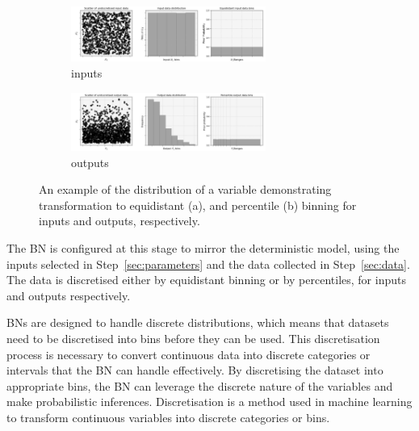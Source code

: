\documentclass[journal]{IEEEtran}
\begin{document}
\begin{figure}[t]
    \centering
    \begin{minipage}{\textwidth}
        \begin{subfigure}{\textwidth}
            \centering
            \includegraphics[width=0.7\textwidth]{figures/TE_results/march_data/equidistant_binning.png}
            \caption{\small inputs}\label{fig:input_dist_eg}
        \end{subfigure}
    \end{minipage}
    \begin{minipage}{\textwidth}
        \begin{subfigure}{\textwidth}
            \centering
            \includegraphics[width=0.7\textwidth]{figures/TE_results/march_data/percentile_binning.png}
            \caption{\small outputs}\label{fig:output_dist_eg}
        \end{subfigure}
    \end{minipage}
    \caption{\small An example of the distribution of a variable demonstrating transformation to equidistant (a), and percentile (b) binning for inputs and outputs, respectively.}\label{fig:dists_eg}
\end{figure}


The BN is configured at this stage to mirror the deterministic model, using the inputs selected in Step~\ref{sec:parameters} and the data collected in Step~\ref{sec:data}. The data is discretised either by equidistant binning or by percentiles, for inputs and outputs respectively.

BNs are designed to handle discrete distributions, which means that datasets need to be discretised into bins before they can be used. This discretisation process is necessary to convert continuous data into discrete categories or intervals that the BN can handle effectively. By discretising the dataset into appropriate bins, the BN can leverage the discrete nature of the variables and make probabilistic inferences. Discretisation is a method used in machine learning to transform continuous variables into discrete categories or bins.
\end{document}
